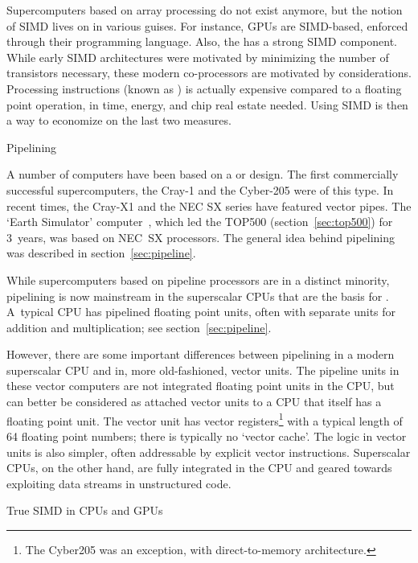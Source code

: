 Supercomputers based on array processing do not exist anymore, but the
notion of SIMD lives on in various guises. For instance, \acp{GPU}
are SIMD-based, enforced through their 
programming language. Also, the  has a
strong SIMD component. While early SIMD architectures were motivated
by minimizing the number of transistors necessary, these modern
co-processors are motivated by 
considerations. Processing instructions (known as
) is actually expensive compared to a
floating point operation, in time, energy, and chip real estate needed.
Using SIMD is then a way to economize on the last two measures.

 {Pipelining}
\label{sec:vector}

A number of computers have been based on a  or  design. The first
commercially successful supercomputers, the Cray-1 and the Cyber-205
were of this type. In recent times, the Cray-X1 and the NEC SX series
have featured vector pipes. The `Earth Simulator'
computer~\cite{Sato2004}, which led the TOP500
(section~\ref{sec:top500}) for 3~years, was based on NEC~SX
processors.  The general idea behind pipelining was described in
section~\ref{sec:pipeline}.

While supercomputers based on pipeline processors are in a distinct
minority, pipelining is now mainstream in the superscalar CPUs that
are the basis for . A~typical CPU has pipelined floating point
units, often with separate units for addition and multiplication; see
section~\ref{sec:pipeline}.

However, there are some important differences between pipelining in a
modern superscalar CPU and in, more old-fashioned, vector units.  The
pipeline units in these vector computers are not integrated floating
point units in the CPU, but can better be considered as attached
vector units to a CPU that itself has a floating point unit. The
vector unit has vector registers\footnote{The Cyber205 was an
  exception, with direct-to-memory architecture.} with a typical
length of 64 floating point numbers; there is typically no `vector
cache'. The logic in vector units is also simpler, often addressable
by explicit vector instructions. Superscalar CPUs, on the other hand,
are fully integrated in the CPU and geared towards exploiting data
streams in unstructured code.

 {True SIMD in CPUs and GPUs}
\label{sec:sse-avx}


